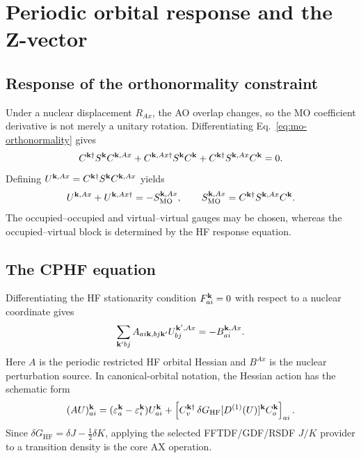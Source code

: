 \section{Periodic orbital response and the Z-vector}
\label{sec:orbital-response}

\subsection{Response of the orthonormality constraint}

Under a nuclear displacement $R_{Ax}$, the AO overlap changes, so the MO
coefficient derivative is not merely a unitary rotation.  Differentiating
Eq.~\eqref{eq:mo-orthonormality} gives
\begin{equation}
  C^{\mathbf{k}\dagger}S^{\mathbf{k}}C^{\mathbf{k},Ax}
  +C^{\mathbf{k},Ax\dagger}S^{\mathbf{k}}C^{\mathbf{k}}
  +C^{\mathbf{k}\dagger}S^{\mathbf{k},Ax}C^{\mathbf{k}}=0.
  \label{eq:orthonormality-response}
\end{equation}
Defining $U^{\mathbf{k},Ax}=C^{\mathbf{k}\dagger}S^{\mathbf{k}}C^{\mathbf{k},Ax}$ yields
\begin{equation}
  U^{\mathbf{k},Ax}+U^{\mathbf{k},Ax\dagger}
  =-S_{\mathrm{MO}}^{\mathbf{k},Ax},
  \qquad
  S_{\mathrm{MO}}^{\mathbf{k},Ax}=C^{\mathbf{k}\dagger}S^{\mathbf{k},Ax}C^{\mathbf{k}}.
  \label{eq:u-overlap-constraint}
\end{equation}
The occupied--occupied and virtual--virtual gauges may be chosen, whereas the
occupied--virtual block is determined by the HF response equation.

\subsection{The CPHF equation}

Differentiating the HF stationarity condition $F_{ai}^{\mathbf{k}}=0$ with respect to
a nuclear coordinate gives
\begin{equation}
  \sum_{\mathbf{k}'bj}A_{ai\mathbf{k},bj\mathbf{k}'}U_{bj}^{\mathbf{k}',Ax}
  =-B_{ai}^{\mathbf{k},Ax}.
  \label{eq:cphf-equation}
\end{equation}
Here $A$ is the periodic restricted HF orbital Hessian and $B^{Ax}$ is the
nuclear perturbation source.  In canonical-orbital notation, the Hessian
action has the schematic form
\begin{equation}
  (AU)_{ai}^{\mathbf{k}}
  =(\varepsilon_a^{\mathbf{k}}-\varepsilon_i^{\mathbf{k}})U_{ai}^{\mathbf{k}}
  +\left[C_v^{\mathbf{k}\dagger}\,\delta G_{\mathrm{HF}}[D^{(1)}(U)]^{\mathbf{k}}
  C_o^{\mathbf{k}}\right]_{ai}.
  \label{eq:hf-hessian-action}
\end{equation}
Since $\delta G_{\mathrm{HF}}=\delta J-\tfrac12\delta K$, applying the selected
FFTDF/GDF/RSDF $J/K$ provider to a transition density is the core AX
operation.

